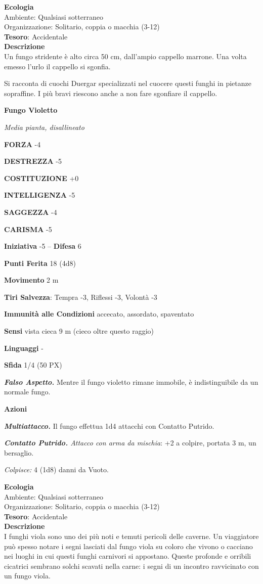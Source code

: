 \begin{multicols}{2}
	\textbf{Ecologia}\\
	Ambiente: Qualsiasi sotterraneo\\
	Organizzazione: Solitario, coppia o macchia (3-12)\\
	\textbf{Tesoro}: Accidentale\\
	\textbf{Descrizione}\\
	Un fungo stridente è alto circa 50 cm, dall'ampio cappello marrone. Una volta emesso l'urlo il cappello si sgonfia.

	Si racconta di cuochi Duergar specializzati nel cuocere questi funghi in pietanze sopraffine. I più bravi riescono anche a non fare sgonfiare il cappello.

	\medskip{}\textbf{Fungo Violetto}

	\textit{Media pianta, disallineato}

	\textbf{FORZA} -4

	\textbf{DESTREZZA} -5

	\textbf{COSTITUZIONE} +0

	\textbf{INTELLIGENZA} -5

	\textbf{SAGGEZZA} -4

	\textbf{CARISMA} -5

	\textbf{Iniziativa} -5 -- \textbf{Difesa} 6

	\textbf{Punti Ferita} 18 (4d8)

	\textbf{Movimento} 2 m

	\textbf{Tiri Salvezza}: Tempra -3, Riflessi -3, Volontà -3

	\textbf{Immunità alle Condizioni} accecato, assordato, spaventato

	\textbf{Sensi} vista cieca 9 m (cieco oltre questo raggio)

	\textbf{Linguaggi} -

	\textbf{Sfida} 1/4 (50 PX)

	\textit{\textbf{Falso Aspetto.}} Mentre il fungo violetto rimane immobile, è indistinguibile da un normale fungo.

	\textbf{Azioni}

	\textit{\textbf{Multiattacco.}} Il fungo effettua 1d4 attacchi con Contatto Putrido.

	\textit{\textbf{Contatto Putrido.} Attacco con arma da mischia}: +2 a colpire, portata 3 m, un bersaglio.

	\textit{Colpisce:} 4 (1d8) danni da Vuoto.

	\textbf{Ecologia}\\
	Ambiente: Qualsiasi sotterraneo\\
	Organizzazione: Solitario, coppia o macchia (3-12)\\
	\textbf{Tesoro}: Accidentale\\
	\textbf{Descrizione}\\
	I funghi viola sono uno dei più noti e temuti pericoli delle caverne. Un viaggiatore può spesso notare i segni lasciati dal fungo viola su coloro che vivono o cacciano nei luoghi in cui questi funghi carnivori si appostano. Queste profonde e orribili cicatrici sembrano solchi scavati nella carne: i segni di un incontro ravvicinato con un fungo viola.


\end{multicols}
